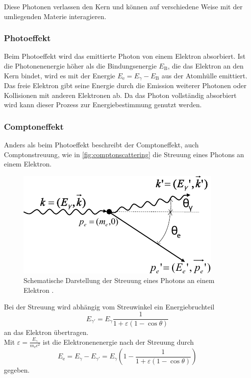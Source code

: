 Diese Photonen verlassen den Kern und können auf verschiedene Weise mit der umliegenden Materie interagieren.

\subsubsection{Photoeffekt}

Beim Photoeffekt wird das emittierte Photon von einem Elektron absorbiert.
Ist die Photonenenergie höher als die Bindungsenergie $E_\text{B}$, die das Elektron an den Kern bindet, wird es mit der Energie $E_\text{e} = E_\gamma - E_\text{B}$
aus der Atomhülle emittiert.
Das freie Elektron gibt seine Energie durch die Emission weiterer Photonen oder Kollisionen mit anderen Elektronen ab.
Da das Photon vollständig absorbiert wird kann dieser Prozess zur Energiebestimmung genutzt werden.

\subsubsection{Comptoneffekt}

Anders als beim Photoeffekt beschreibt der Comptoneffekt, auch Comptonstreuung, wie in \autoref{fig:comptonscattering} die Streuung eines Photons an einem Elektron.

\begin{figure}
    \centering
    \includegraphics{figures/compton.pdf}
    \caption{Schematische Darstellung der Streuung eines Photons an einem Elektron \cite{Teilchendetektoren}.}
    \label{fig:comptonscattering}
\end{figure}

Bei der Streuung wird abhängig vom Streuwinkel ein Energiebruchteil
\begin{equation}
    E_{\gamma'} = E_\gamma \frac{1}{1 + \varepsilon (1 - \cos\theta)}
    \label{eq:Egammaprime}
\end{equation}
an das Elektron übertragen. \\
Mit $\varepsilon = \frac{E_\gamma}{m_\text{e} c^2}$ ist die Elektronenenergie nach der Streuung durch
\begin{equation}
    E_\text{e} = E_\gamma -E_{\gamma'} = E_\gamma (1 - \frac{1}{1 + \varepsilon (1 - \cos\theta)}) 
    \label{eq:elektronenenergie}
\end{equation}
gegeben. \\

